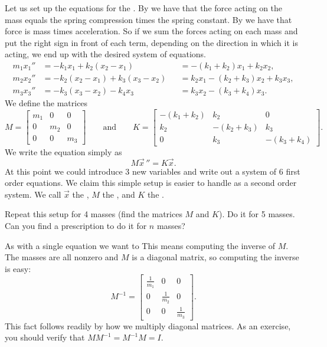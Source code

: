 \documentclass[12pt]{book}
\begin{document}
Let us set up the equations for the .
By  we have that the force acting on the mass equals the 
spring compression times the spring constant.  By
we have
that force is mass times acceleration.  So if we sum the forces acting
on each mass and put the right sign in front of each term, depending on the
direction in which it is acting, we end up with the desired system of
equations.
\begin{equation*}
\begin{aligned}
m_1 x_1'' &= -k_1 x_1 + k_2 (x_2-x_1)
& & = -(k_1+k_2) x_1 + k_2 x_2 , \\
m_2 x_2'' &= -k_2 (x_2-x_1) + k_3 (x_3-x_2)
& & = k_2 x_1 -(k_2+k_3) x_2 + k_3 x_3 , \\
m_3 x_3'' &= -k_3 (x_3-x_2) - k_4 x_3
& & = k_3 x_2 - (k_3+k_4) x_3 . 
\end{aligned}
\end{equation*}
We define the matrices
\begin{equation*}
M =
\begin{bmatrix}
m_1 & 0 & 0 \\
0 & m_2 & 0 \\
0 & 0 & m_3
\end{bmatrix}
\qquad
\text{and}
\qquad
K =
\begin{bmatrix}
-(k_1+k_2) & k_2 & 0 \\
k_2 & -(k_2+k_3) & k_3 \\
0 & k_3 & -(k_3+k_4)
\end{bmatrix} .
\end{equation*}
We write the equation simply as
\begin{equation*}
M {\vec{x}\,}'' = K \vec{x} .
\end{equation*}
At this point we could introduce 3 new variables and write out a system
of 6 first order equations.  We claim this simple setup is easier to handle as
a second order system.
We call $\vec{x}$ the \emph{}, $M$ the
\emph{}, and $K$ the \emph{}.

\begin{exercise}
Repeat this setup for 4 masses (find the matrices $M$ and $K$).
Do it for 5 masses.  Can you
find a prescription to do it for $n$ masses?
\end{exercise}

As with a single equation we want to   This means
computing the inverse of $M$.
The masses are all nonzero and $M$ is a
diagonal matrix, so computing the inverse
is easy:
\begin{equation*}
M^{-1} =
\begin{bmatrix}
\frac{1}{m_1} & 0 & 0 \\
0 & \frac{1}{m_2} & 0 \\
0 & 0 & \frac{1}{m_3}
\end{bmatrix} .
\end{equation*}
This fact follows readily
by how we multiply diagonal matrices.  As an exercise, you should verify that
$M M^{-1} = M^{-1} M = I$.
\end{document}
